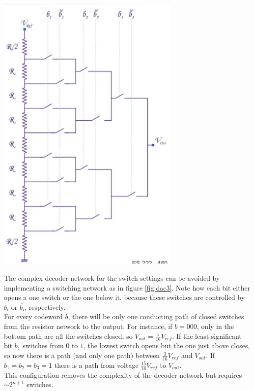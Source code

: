 \begin{minipage}{.6\textwidth}
	\centering
	\includegraphics[width=9cm]{figures/ch18/dac3.jpg}
	\label{fig:dac3}
\end{minipage}%
\begin{minipage}{.35\textwidth}
	The complex decoder network for the switch settings can be avoided by implementing a switching network as in figure \ref{fig:dac3}. Note how each bit either opens a one switch or the one below it, because these switches are controlled by $b_i$ or $\overline{b_i}$, respectively.\\
	For every codeword $b$, there will be only one conducting path of closed switches from the resistor network to the output. For instance, if $b = 000$, only in the bottom path are all the switches closed, so $V_{out} = \frac{1}{16} V_{ref}$. If the least significant bit $b_1$ switches from $0$ to $1$, the lowest switch opens but the one just above closes, so now there is a path (and only one path) between $\frac{3}{16} V_{ref}$ and $V_{out}$. If $b_1 = b_2 = b_3 = 1$ there is a path from voltage $\frac{15}{16} V_{ref}$ to $V_{out}$.\\
	 This configuration removes the complexity of the decoder network but requires $\sim 2^{n+1}$ switches.
\end{minipage}

